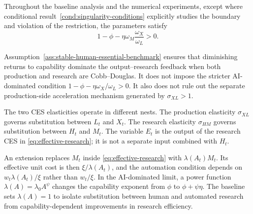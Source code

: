 \begin{assumption}
\label{ass:stable-human-essential-benchmark}
Throughout the baseline analysis and the numerical experiments, except where
conditional result~\ref{cond:singularity-conditions} explicitly studies the boundary
and violation of the restriction, the parameters satisfy
\begin{equation}
    1-\phi
    -\eta\omega_M\frac{\omega_X}{\omega_L}
    >0.
    \label{eq:fully-cd-stability-condition}
\end{equation}
\end{assumption}

Assumption~\ref{ass:stable-human-essential-benchmark} ensures that diminishing
returns to capability dominate the output--research feedback when both production
and research are Cobb--Douglas. It does not impose the stricter AI-dominated
condition $1-\phi-\eta\omega_X/\omega_L>0$. It also does not rule out the separate
production-side acceleration mechanism generated by $\sigma_{XL}>1$.

The two CES elasticities operate in different nests. The production elasticity
$\sigma_{XL}$ governs substitution between $L_t$ and $X_t$. The research elasticity
$\sigma_{HM}$ governs substitution between $H_t$ and $M_t$. The variable $E_t$ is the
output of the research CES in \eqref{eq:effective-research}; it is not a separate
input combined with $H_t$.

\begin{remark}
An extension replaces $M_t$ inside \eqref{eq:effective-research} with
$\lambda(A_t)M_t$. Its effective unit cost is then $\xi/\lambda(A_t)$, and the
automation condition depends on $w_t\lambda(A_t)/\xi$ rather than $w_t/\xi$. In the
AI-dominated limit, a power function $\lambda(A)=\lambda_0A^\psi$ changes the
capability exponent from $\phi$ to $\phi+\psi\eta$. The baseline sets
$\lambda(A)=1$ to isolate substitution between human and automated research from
capability-dependent improvements in research efficiency.
\end{remark}

